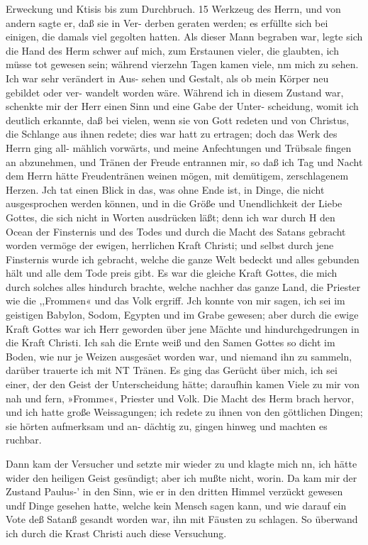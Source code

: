 Erweckung und Ktisis bis zum Durchbruch. 15
Werkzeug des Herrn, und von andern sagte er, daß sie in Ver-
derben geraten werden; es erfüllte sich bei einigen, die damals
viel gegolten hatten. Als dieser Mann begraben war, legte sich
die Hand des Herm schwer auf mich, zum Erstaunen vieler, die
glaubten, ich müsse tot gewesen sein; während vierzehn Tagen
kamen viele, nm mich zu sehen. Ich war sehr verändert in Aus-
sehen und Gestalt, als ob mein Körper neu gebildet oder ver-
wandelt worden wäre. Während ich in diesem Zustand war,
schenkte mir der Herr einen Sinn und eine Gabe der Unter-
scheidung, womit ich deutlich erkannte, daß bei vielen, wenn sie
von Gott redeten und von Christus, die Schlange aus ihnen redete;
dies war hatt zu ertragen; doch das Werk des Herrn ging all-
mählich vorwärts, und meine Anfechtungen und Trübsale fingen
an abzunehmen, und Tränen der Freude entrannen mir, so daß
ich Tag und Nacht dem Herrn hätte Freudentränen weinen mögen,
mit demütigem, zerschlagenem Herzen. Jch tat einen Blick in das,
was ohne Ende ist, in Dinge, die nicht ausgesprochen werden
können, und in die Größe und Unendlichkeit der Liebe Gottes,
die sich nicht in Worten ausdrücken läßt; denn ich war durch H
den Ocean der Finsternis und des Todes und durch die Macht
des Satans gebracht worden vermöge der ewigen, herrlichen Kraft
Christi; und selbst durch jene Finsternis wurde ich gebracht, welche
die ganze Welt bedeckt und alles gebunden hält und alle dem Tode
preis gibt. Es war die gleiche Kraft Gottes, die mich durch
solches alles hindurch brachte, welche nachher das ganze Land,
die Priester wie die ,,Frommen« und das Volk ergriff.
Jch konnte von mir sagen, ich sei im geistigen Babylon, Sodom,
Egypten und im Grabe gewesen; aber durch die ewige Kraft Gottes
war ich Herr geworden über jene Mächte und hindurchgedrungen
in die Kraft Christi. Ich sah die Ernte weiß und den Samen
Gottes so dicht im Boden, wie nur je Weizen ausgesäet worden
war, und niemand ihn zu sammeln, darüber trauerte ich mit NT
Tränen.
Es ging das Gerücht über mich, ich sei einer, der den Geist
der Unterscheidung hätte; daraufhin kamen Viele zu mir von nah
und fern, »Fromme«, Priester und Volk. Die Macht des Herm
brach hervor, und ich hatte große Weissagungen; ich redete zu
ihnen von den göttlichen Dingen; sie hörten aufmerksam und an-
dächtig zu, gingen hinweg und machten es ruchbar.


Dann kam der Versucher und setzte mir wieder zu und
klagte mich nn, ich hätte wider den heiligen Geist gesündigt; aber
ich mußte nicht, worin. Da kam mir der Zustand Paulus-’ in
den Sinn, wie er in den dritten Himmel verzückt gewesen undf
Dinge gesehen hatte, welche kein Mensch sagen kann, und wie
darauf ein Vote deß Satanß gesandt worden war, ihn mit
Fäusten zu schlagen. So überwand ich durch die Krast Christi
auch diese Versuchung.

